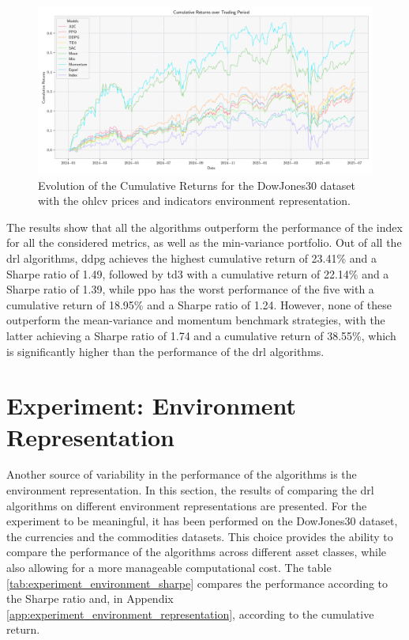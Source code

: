 \begin{figure}
    \centering
    \includegraphics[width=\textwidth]{figures/dowjones30_indicators_cumulative_returns.png}
    \caption{Evolution of the Cumulative Returns for the DowJones30 dataset with the \acrshort{ohlcv} prices and indicators environment representation.}
    \label{fig:dowjones30_indicators_cumulative_returns}
\end{figure}



The results show that all the algorithms outperform the performance of the index for all the considered metrics, as well as the min-variance portfolio. Out of all the \acrshort{drl} algorithms, \acrshort{ddpg} achieves the highest cumulative return of 23.41\% and a Sharpe ratio of 1.49, followed by \acrshort{td3} with a cumulative return of 22.14\% and a Sharpe ratio of 1.39, while \acrshort{ppo} has the worst performance of the five with a cumulative return of 18.95\% and a Sharpe ratio of 1.24. However, none of these outperform the mean-variance and momentum benchmark strategies, with the latter achieving a Sharpe ratio of 1.74 and a cumulative return of 38.55\%, which is significantly higher than the performance of the \acrshort{drl} algorithms.

\section{Experiment: Environment Representation} \label{sec:environment-representation}

Another source of variability in the performance of the algorithms is the environment representation. In this section, the results of comparing the \acrshort{drl} algorithms on different environment representations are presented. For the experiment to be meaningful, it has been performed on the DowJones30 dataset, the currencies and the commodities datasets. This choice provides the ability to compare the performance of the algorithms across different asset classes, while also allowing for a more manageable computational cost. The table \ref{tab:experiment_environment_sharpe} compares the performance according to the Sharpe ratio and, in Appendix \ref{app:experiment_environment_representation}, according to the cumulative return.

